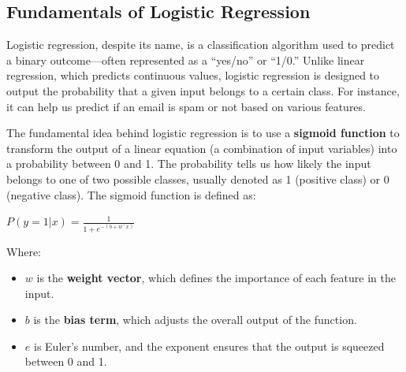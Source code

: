 \subsection{Fundamentals of Logistic Regression}
\begin{flushleft}
    \large Logistic regression, despite its name, is a classification algorithm used to predict a binary outcome—often represented as a “yes/no” or “1/0.” Unlike linear regression, which predicts continuous values, logistic regression is designed to output the probability that a given input belongs to a certain class. For instance, it can help us predict if an email is spam or not based on various features.

    The fundamental idea behind logistic regression is to use a \textbf{sigmoid function} to transform the output of a linear equation (a combination of input variables) into a probability between 0 and 1. The probability tells us how likely the input belongs to one of two possible classes, usually denoted as 1 (positive class) or 0 (negative class). The sigmoid function is defined as:

    \begin{center}
        \( P(y=1|x) = \frac{1}{1 + e^{-(b + w^{\top}x)}} \)
    \end{center}
    
    Where:
    \begin{itemize}
        \item \( w \) is the \textbf{weight vector}, which defines the importance of each feature in the input.
        \item \( b \) is the \textbf{bias term}, which adjusts the overall output of the function.
        \item \( e \) is Euler’s number, and the exponent ensures that the output is squeezed between 0 and 1.
    \end{itemize}
\end{flushleft}

